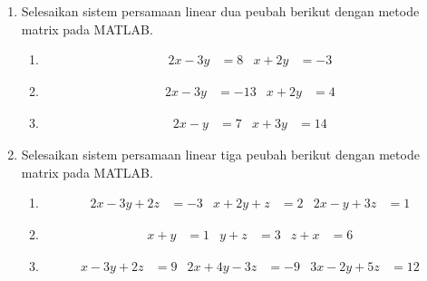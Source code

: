 \documentclass[12pt]{book}
\begin{document}
	\begin{enumerate}
		\item Selesaikan sistem persamaan linear dua peubah berikut dengan metode matrix pada MATLAB.
		\begin{enumerate}[label=(\alph*)]
			\item
			\begin{align*}
				2x-3y&=8 & x+2y&=-3
			\end{align*}

			\item
			\begin{align*}
				2x-3y&=-13 & x+2y&=4
			\end{align*}

			\item
			\begin{align*}
				2x-y&=7 & x+3y&=14
			\end{align*}
		\end{enumerate}

		\item Selesaikan sistem persamaan linear tiga peubah berikut dengan metode matrix pada MATLAB.
		\begin{enumerate}[label=(\alph*)]
			\item
			\begin{align*}
				2x-3y+2z&=-3 & x+2y+z&=2 & 2x-y+3z&=1
			\end{align*}

			\item
			\begin{align*}
				x+y&=1 & y+z&=3 & z+x&=6
			\end{align*}

			\item
			\begin{align*}
				x-3y+2z&=9 & 2x+4y-3z&=-9 & 3x-2y+5z&=12
			\end{align*}
		\end{enumerate}
	\end{enumerate}
\end{document}
